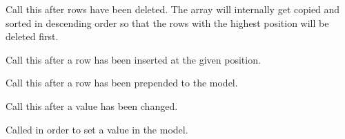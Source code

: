 Call this after rows have been deleted. The array will internally
get copied and sorted in descending order so that the rows with
the highest position will be deleted first.

\label{wxdataviewindexlistmodelrowinserted}


Call this after a row has been inserted at the given position.

\label{wxdataviewindexlistmodelrowprepended}


Call this after a row has been prepended to the model.

\label{wxdataviewindexlistmodelrowvaluechanged}


Call this after a value has been changed.

\label{wxdataviewindexlistmodelsetvalue}


Called in order to set a value in the model.
